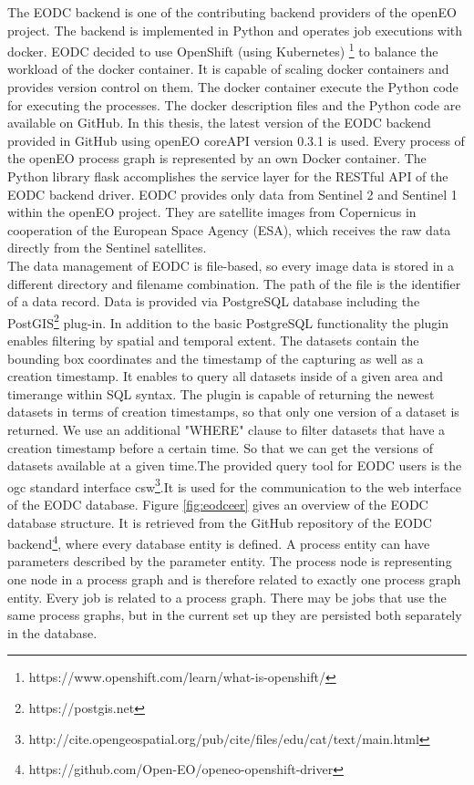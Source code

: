 \documentclass[draft,final]{vutinfth} %
\begin{document}
The EODC backend is one of the contributing backend providers of the openEO project. The backend is implemented in Python and operates job executions with docker. EODC decided to use OpenShift (using Kubernetes) \footnote{https://www.openshift.com/learn/what-is-openshift/} to balance the workload of the docker container. It is capable of scaling docker containers and provides version control on them. The docker container execute the Python code for executing the processes. The docker description files and the Python code are available on GitHub. In this thesis, the latest version of the EODC backend provided in GitHub using openEO coreAPI version 0.3.1 is used. Every process of the openEO process graph is represented by an own Docker container. The Python library flask accomplishes the service layer for the RESTful API of the EODC backend driver. EODC provides only data from Sentinel 2 and Sentinel 1 within the openEO project. They are satellite images from Copernicus in cooperation of the European Space Agency (ESA), which receives the raw data directly from the Sentinel satellites. \\
The data management of EODC is file-based, so every image data is stored in a different directory and filename combination. The path of the file is the identifier of a data record. Data is provided via PostgreSQL database including the PostGIS\footnote{https://postgis.net} plug-in. {In addition to the basic PostgreSQL functionality the plugin enables filtering by spatial and temporal extent. The datasets contain the bounding box coordinates and the timestamp of the capturing as well as a creation timestamp. It enables to query all datasets inside of a given area and timerange within SQL syntax. The plugin is capable of returning the newest datasets in terms of creation timestamps, so that only one version of a dataset is returned. We use an additional "WHERE" clause to filter datasets that have a creation timestamp before a certain time. So that we can get the versions of datasets available at a given time.}The provided query tool for EODC users is the \gls{ogc} standard interface \gls{csw}\footnote{http://cite.opengeospatial.org/pub/cite/files/edu/cat/text/main.html}.{It is used for the communication to the web interface of the EODC database.} Figure \ref{fig:eodceer} gives an overview of the EODC database structure. It is retrieved from the GitHub repository of the EODC backend\footnote{https://github.com/Open-EO/openeo-openshift-driver}, where every database entity is defined. A process entity can have parameters described by the parameter entity. The process node is representing one node in a process graph and is therefore related to exactly one process graph entity. Every job is related to a process graph. There may be jobs that use the same process graphs, but in the current set up they are persisted both separately in the database.
\end{document}
